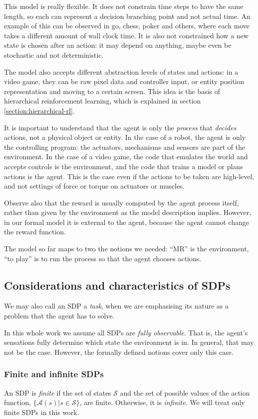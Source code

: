 This model is really flexible. It does not constrain time steps to have the same
length, so each can represent a decision branching point and not actual time. An
example of this can be observed in go, chess, poker and others, where each move
takes a different amount of wall clock time. It is also not constrained how a new
state is chosen after an action: it may depend on anything, maybe even be
stochastic and not deterministic.

The model also accepts different abstraction levels of states and actions: in a
video game, they can be raw pixel data and controller input, or entity position
representation and moving to a certain screen. This idea is the basis of
hierarchical reinforcement learning, which is explained in section
\ref{section:hierarchical-rl}.

It is important to understand that the agent is only the \emph{process} that
\emph{decides} actions, not a physical object or entity. In the case of a robot, the
agent is only the controlling program: the actuators, mechanisms and sensors are part
of the environment. In the case of a video game, the code that emulates
the world and accepts controls is the environment, and the code that trains a
model or plans actions is the agent. This is the case even if the actions to be
taken are high-level, and not settings of force or torque on actuators or
muscles.

Observe also that the reward is usually computed by the agent process itself,
rather than given by the environment as the model description implies. However,
in our formal model it is external to the agent, because the agent cannot change
the reward function.

The model so far maps to two the notions we needed: ``\acl{MR}'' is the environment,
``to play'' is to run the process so that the agent chooses actions.
\subsection{Considerations and characteristics of \acp{SDP}}
We may also call an \ac{SDP} a \emph{task}, when we are emphasising its nature
as a problem that the agent has to solve.

In this whole work we assume all \aclp{SDP} are \emph{fully observable}. That
is, the agent's sensations fully determine which state the environment is in. In
general, that may not be the case. However, the formally defined notions cover
only this case.

\subsubsection{Finite and infinite \acp{SDP}}
An \ac{SDP} is \emph{finite} if the set of states $\mathcal{S}$ and the set of possible
values of the action function, $\lbrace \mathcal{A}(s) | s \in \mathcal{S}
\rbrace$, are finite. Otherwise, it is \emph{infinite}. We will treat only
finite \acp{SDP} in this work.

